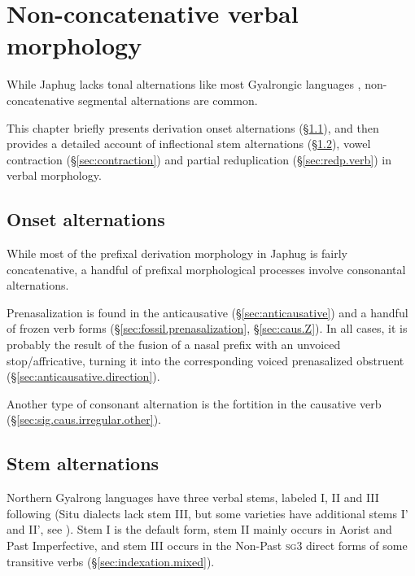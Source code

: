 \chapter{Non-concatenative verbal morphology} \label{chap:nonconcatenative}
While Japhug lacks tonal alternations like most Gyalrongic languages \citep{jackson05yingao, lai17khroskyabs, gong18these, zhangsy18stem}, non-concatenative segmental alternations are common.

This chapter briefly presents derivation onset alternations (§\ref{sec:onset.alternations}), and then provides a detailed account of inflectional stem alternations (§\ref{sec:stem.alternation}), vowel contraction (§\ref{sec:contraction}) and partial reduplication (§\ref{sec:redp.verb}) in verbal morphology.



\section{Onset alternations} \label{sec:onset.alternations}
While most of the prefixal derivation morphology in Japhug is fairly concatenative, a handful of prefixal morphological processes involve consonantal alternations. 

Prenasalization is found in the anticausative (§\ref{sec:anticausative}) and a handful of frozen verb forms (§\ref{sec:fossil.prenasalization}, §\ref{sec:caus.Z}).  In all cases, it is probably the result of the fusion of a nasal prefix with an unvoiced stop/affricative, turning it into the corresponding voiced prenasalized obstruent (§\ref{sec:anticausative.direction}).

Another type of consonant alternation is the  \fl{}  fortition in the causative verb   (§\ref{sec:sig.caus.irregular.other}).


\section{Stem alternations} \label{sec:stem.alternation}
Northern Gyalrong languages have three verbal stems, labeled I, II and III following \citet{jackson00sidaba} (Situ dialects lack stem III, but some varieties have additional stems I' and II', see \citealt{zhangsy18stem}). Stem I is the default form, stem II mainly occurs in Aorist and Past Imperfective, and stem III occurs in the Non-Past \textsc{sg}\fl{}3 direct forms of some transitive verbs (§\ref{sec:indexation.mixed}).

